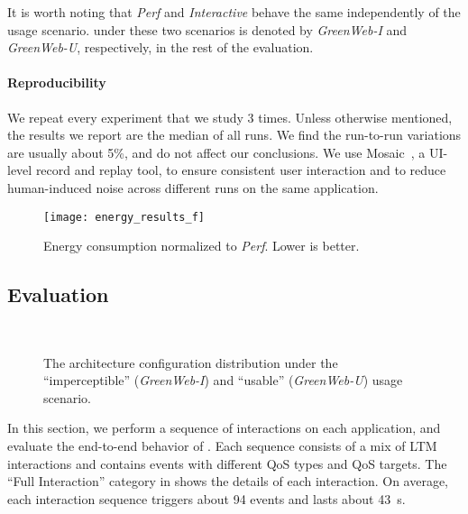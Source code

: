 It is worth noting that \textit{Perf} and \textit{Interactive} behave the same independently of the usage scenario. \greenweb under these two scenarios is denoted by \textit{GreenWeb-I} and \textit{GreenWeb-U}, respectively, in the rest of the evaluation.

\paragraph{Reproducibility} We repeat every experiment that we study 3 times. Unless otherwise mentioned, the results we report are the median of all runs. We find the run-to-run variations are usually about 5\%, and do not affect our conclusions. We use Mosaic~\cite{mosaic}, a UI-level record and replay tool, to ensure consistent user interaction and to reduce human-induced noise across different runs on the same application.



\begin{figure}[t]
\centering
\texttt{[image: energy\_results\_f]}
\caption{Energy consumption normalized to \textit{Perf}. Lower is better.}
\label{fig:energy_results_f}
\end{figure}

\subsection{Evaluation}
\label{sec:runtime:ebs:eval}

\begin{figure}[t]
\centering
{}\\
\caption{The architecture configuration distribution under the ``imperceptible'' (\textit{GreenWeb-I}) and ``usable''  (\textit{GreenWeb-U}) usage scenario.}
\label{fig:freq_dist}
\end{figure}

In this section, we perform a sequence of interactions on each application, and evaluate the end-to-end behavior of \greenweb. Each sequence consists of a mix of LTM interactions and contains events with different QoS types and QoS targets. The ``Full Interaction'' category in  shows the details of each interaction. On average, each interaction sequence triggers about 94 events and lasts about 43~s.

